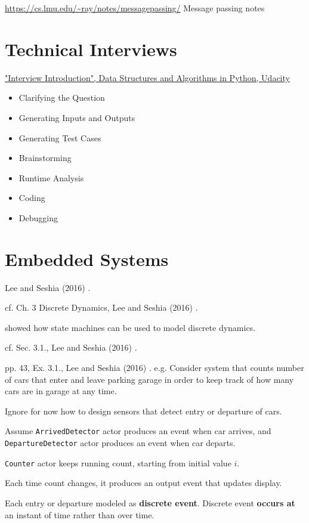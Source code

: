 \documentclass[10pt]{amsart}
\begin{document}
\begin{multicols*}{2}
\url{https://cs.lmu.edu/~ray/notes/messagepassing/} Message passing notes
	
\part{Technical Interviews}

\href{https://classroom.udacity.com/courses/ud513/lessons/7707710408/concepts/77114606610923}{"Interview Introduction", Data Structures and Algorithms in Python, Udacity}

\begin{itemize}
	\item Clarifying the Question
	\item Generating Inputs and Outputs
	\item Generating Test Cases
	\item Brainstorming
	\item Runtime Analysis
	\item Coding
	\item Debugging
\end{itemize}

\part{Embedded Systems}

Lee and Seshia (2016) \cite{LeSe2016}.

cf. Ch. 3 Discrete Dynamics, Lee and Seshia (2016) \cite{LeSe2016}. 

showed how state machines can be used to model discrete dynamics.

cf. Sec. 3.1., Lee and Seshia (2016) \cite{LeSe2016}. 

pp. 43, Ex. 3.1., Lee and Seshia (2016) \cite{LeSe2016}. e.g. Consider system that counts number of cars that enter and leave parking garage in order to keep track of how many cars are in garage at any time. 

Ignore for now how to design sensors that detect entry or departure of cars.

Assume \texttt{ArrivedDetector} actor produces an event when car arrives, and \texttt{DepartureDetector} actor produces an event when car departs.

\texttt{Counter} actor keeps running count, starting from initial value $i$. 

Each time count changes, it produces an output event that updates display.

Each entry or departure modeled as \textbf{discrete event}. Discrete event \textbf{occurs at} an instant of time rather than over time.


\end{multicols*}
\end{document}
